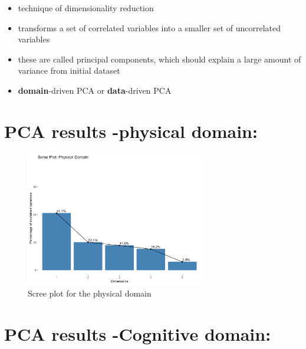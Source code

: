\documentclass[
  letterpaper,
  DIV=11,
  numbers=noendperiod]{scrartcl}
\providecommand{\tightlist}{%
  \setlength{\itemsep}{0pt}\setlength{\parskip}{0pt}}\usepackage{longtable,booktabs,array}
\begin{document}
\begin{itemize}
\tightlist
\item
  technique of dimensionality reduction
\item
  transforms a set of correlated variables into a smaller set of
  uncorrelated variables
\item
  these are called principal components, which should explain a large
  amount of variance from initial dataset
\item
  \textbf{domain}-driven PCA or \textbf{data}-driven PCA
\end{itemize}

\hypertarget{pca-results--physical-domain}{%
\section{PCA results -physical
domain:}\label{pca-results--physical-domain}}

\begin{figure}

{\centering \includegraphics[width=0.7\textwidth,height=\textheight]{imgs/scree_plot_physical.png}

}

\caption{Scree plot for the physical domain}

\end{figure}

\hypertarget{pca-results--cognitive-domain}{%
\section{PCA results -Cognitive
domain:}\label{pca-results--cognitive-domain}}
\end{document}
